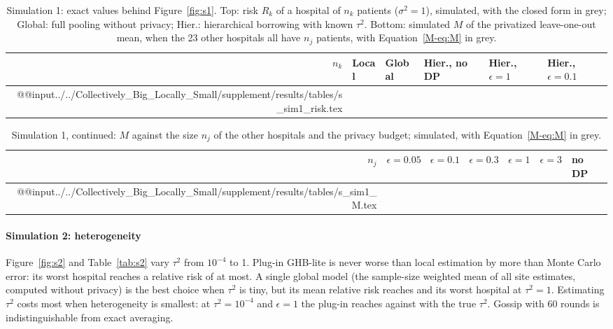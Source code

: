 \documentclass[acmsmall,screen,nonacm]{acmart}
\theoremstyle{acmdefinition}
\begin{document}
\begin{table}[t]
\caption{Simulation 1: exact values behind Figure~\ref{fig:s1}. Top: risk $R_k$ of a hospital of $n_k$ patients ($\sigma^2=1$), simulated, with the closed form in grey; Global: full pooling without privacy; Hier.: hierarchical borrowing with known $\tau^2$. Bottom: simulated $M$ of the privatized leave-one-out mean, when the 23 other hospitals all have $n_j$ patients, with Equation~\eqref{M-eq:M} in grey.}
\label{tab:s1}
\scriptsize
\setlength{\tabcolsep}{4pt}
\begin{tabular}{@{}rlllll@{}}
\toprule
$n_k$ & Local & Global & Hier., no DP & Hier., $\epsilon=1$ & Hier., $\epsilon=0.1$\\
\midrule
\csname @@input\endcsname../../Collectively_Big_Locally_Small/supplement/results/tables/s_sim1_risk.tex 
\bottomrule
\end{tabular}
\end{table}

\begin{table}[t]
\caption{Simulation 1, continued: $M$ against the size $n_j$ of the other hospitals and the privacy budget; simulated, with Equation~\eqref{M-eq:M} in grey.}
\label{tab:s1M}
\scriptsize
\setlength{\tabcolsep}{4pt}
\begin{tabular}{@{}rllllll@{}}
\toprule
$n_j$ & $\epsilon=0.05$ & $\epsilon=0.1$ & $\epsilon=0.3$ & $\epsilon=1$ & $\epsilon=3$ & no DP\\
\midrule
\csname @@input\endcsname../../Collectively_Big_Locally_Small/supplement/results/tables/s_sim1_M.tex 
\bottomrule
\end{tabular}
\end{table}


\paragraph{Simulation 2: heterogeneity} Figure~\ref{fig:s2} and Table~\ref{tab:s2} vary $\tau^2$ from $10^{-4}$ to 1. Plug-in GHB-lite is never worse than local estimation by more than Monte Carlo error: its worst hospital reaches a relative risk of \SimTwoWorstGHB{} at most. A single global model (the sample-size weighted mean of all site estimates, computed without privacy) is the best choice when $\tau^2$ is tiny, but its mean relative risk reaches \SimTwoMeanPool{} and its worst hospital \SimTwoWorstPool{} at $\tau^2=1$. Estimating $\tau^2$ costs most when heterogeneity is smallest: at $\tau^2=10^{-4}$ and $\epsilon=1$ the plug-in reaches \SimTwoMinGHB{} against \SimTwoMinOracle{} with the true $\tau^2$. Gossip with 60 rounds is indistinguishable from exact averaging.
\end{document}
